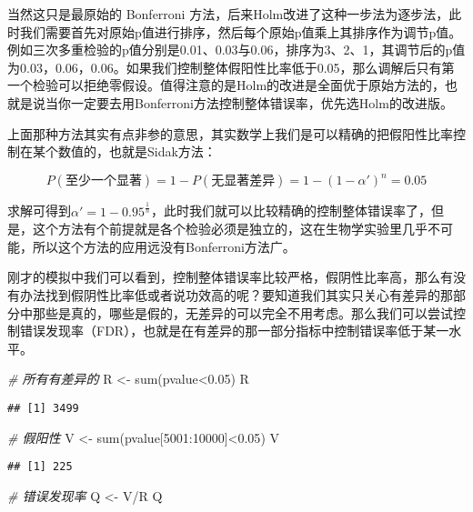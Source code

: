\documentclass[]{tufte-book}
\newenvironment{Shaded}{}{}
\newcommand{\CommentTok}[1]{\textcolor[rgb]{0.38,0.63,0.69}{\textit{#1}}}
\newcommand{\DecValTok}[1]{\textcolor[rgb]{0.25,0.63,0.44}{#1}}
\newcommand{\FloatTok}[1]{\textcolor[rgb]{0.25,0.63,0.44}{#1}}
\newcommand{\FunctionTok}[1]{\textcolor[rgb]{0.02,0.16,0.49}{#1}}
\newcommand{\NormalTok}[1]{#1}
\newcommand{\OtherTok}[1]{\textcolor[rgb]{0.00,0.44,0.13}{#1}}
\newcommand{\SpecialCharTok}[1]{\textcolor[rgb]{0.25,0.44,0.63}{#1}}
\begin{document}
当然这只是最原始的 Bonferroni 方法，后来Holm改进了这种一步法为逐步法，此时我们需要首先对原始p值进行排序，然后每个原始p值乘上其排序作为调节p值。例如三次多重检验的p值分别是0.01、0.03与0.06，排序为3、2、1，其调节后的p值为0.03，0.06，0.06。如果我们控制整体假阳性比率低于0.05，那么调解后只有第一个检验可以拒绝零假设。值得注意的是Holm的改进是全面优于原始方法的，也就是说当你一定要去用Bonferroni方法控制整体错误率，优先选Holm的改进版。

上面那种方法其实有点非参的意思，其实数学上我们是可以精确的把假阳性比率控制在某个数值的，也就是Sidak方法：

\[
P(至少一个显著)=1-P(无显著差异) = 1-(1-\alpha')^n = 0.05
\]

求解可得到\(\alpha' = 1-0.95^{\frac{1}{n}}\)，此时我们就可以比较精确的控制整体错误率了，但是，这个方法有个前提就是各个检验必须是独立的，这在生物学实验里几乎不可能，所以这个方法的应用远没有Bonferroni方法广。

刚才的模拟中我们可以看到，控制整体错误率比较严格，假阴性比率高，那么有没有办法找到假阴性比率低或者说功效高的呢？要知道我们其实只关心有差异的那部分中那些是真的，哪些是假的，无差异的可以完全不用考虑。那么我们可以尝试控制错误发现率（FDR），也就是在有差异的那一部分指标中控制错误率低于某一水平。

\begin{Shaded}
\begin{Highlighting}[]
\CommentTok{\# 所有有差异的}
\NormalTok{R }\OtherTok{\textless{}{-}} \FunctionTok{sum}\NormalTok{(pvalue}\SpecialCharTok{\textless{}}\FloatTok{0.05}\NormalTok{)}
\NormalTok{R}
\end{Highlighting}
\end{Shaded}

\begin{verbatim}
## [1] 3499
\end{verbatim}

\begin{Shaded}
\begin{Highlighting}[]
\CommentTok{\# 假阳性}
\NormalTok{V }\OtherTok{\textless{}{-}} \FunctionTok{sum}\NormalTok{(pvalue[}\DecValTok{5001}\SpecialCharTok{:}\DecValTok{10000}\NormalTok{]}\SpecialCharTok{\textless{}}\FloatTok{0.05}\NormalTok{)}
\NormalTok{V}
\end{Highlighting}
\end{Shaded}

\begin{verbatim}
## [1] 225
\end{verbatim}

\begin{Shaded}
\begin{Highlighting}[]
\CommentTok{\# 错误发现率}
\NormalTok{Q }\OtherTok{\textless{}{-}}\NormalTok{ V}\SpecialCharTok{/}\NormalTok{R}
\NormalTok{Q}
\end{Highlighting}
\end{Shaded}
\end{document}
